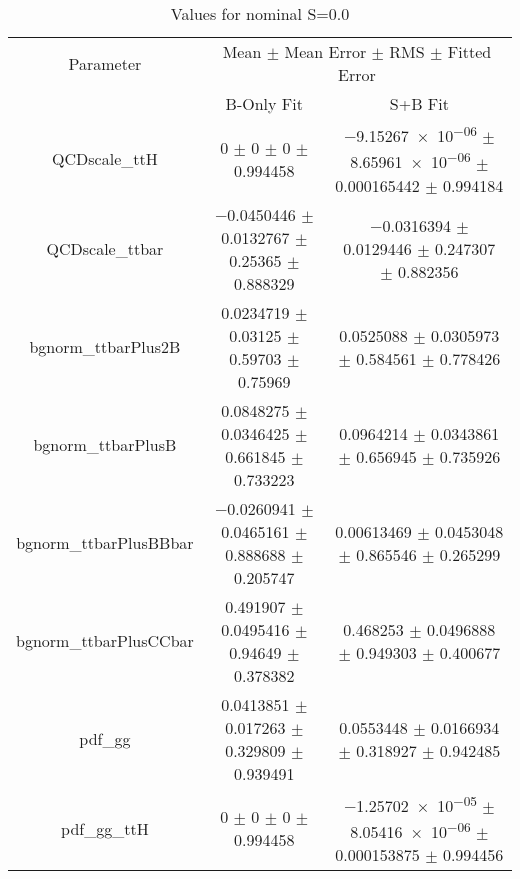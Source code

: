 \begin{table}
\centering
\caption{Values for nominal S=0.0}
\begin{tabular}{ccc}
\toprule
Parameter & \multicolumn{2}{c}{Mean $\pm$ Mean Error $\pm$ RMS $\pm$ Fitted Error}\\
 & B-Only Fit & S+B Fit\\
\midrule
QCDscale\_ttH & \num{0} $\pm$ \num{0} $\pm$ \num{0} $\pm$ \num{0.994458} & \num{-9.15267e-06} $\pm$ \num{8.65961e-06} $\pm$ \num{0.000165442} $\pm$ \num{0.994184}\\
QCDscale\_ttbar & \num{-0.0450446} $\pm$ \num{0.0132767} $\pm$ \num{0.25365} $\pm$ \num{0.888329} & \num{-0.0316394} $\pm$ \num{0.0129446} $\pm$ \num{0.247307} $\pm$ \num{0.882356}\\
bgnorm\_ttbarPlus2B & \num{0.0234719} $\pm$ \num{0.03125} $\pm$ \num{0.59703} $\pm$ \num{0.75969} & \num{0.0525088} $\pm$ \num{0.0305973} $\pm$ \num{0.584561} $\pm$ \num{0.778426}\\
bgnorm\_ttbarPlusB & \num{0.0848275} $\pm$ \num{0.0346425} $\pm$ \num{0.661845} $\pm$ \num{0.733223} & \num{0.0964214} $\pm$ \num{0.0343861} $\pm$ \num{0.656945} $\pm$ \num{0.735926}\\
bgnorm\_ttbarPlusBBbar & \num{-0.0260941} $\pm$ \num{0.0465161} $\pm$ \num{0.888688} $\pm$ \num{0.205747} & \num{0.00613469} $\pm$ \num{0.0453048} $\pm$ \num{0.865546} $\pm$ \num{0.265299}\\
bgnorm\_ttbarPlusCCbar & \num{0.491907} $\pm$ \num{0.0495416} $\pm$ \num{0.94649} $\pm$ \num{0.378382} & \num{0.468253} $\pm$ \num{0.0496888} $\pm$ \num{0.949303} $\pm$ \num{0.400677}\\
pdf\_gg & \num{0.0413851} $\pm$ \num{0.017263} $\pm$ \num{0.329809} $\pm$ \num{0.939491} & \num{0.0553448} $\pm$ \num{0.0166934} $\pm$ \num{0.318927} $\pm$ \num{0.942485}\\
pdf\_gg\_ttH & \num{0} $\pm$ \num{0} $\pm$ \num{0} $\pm$ \num{0.994458} & \num{-1.25702e-05} $\pm$ \num{8.05416e-06} $\pm$ \num{0.000153875} $\pm$ \num{0.994456}\\
\bottomrule
\end{tabular}
\end{table}